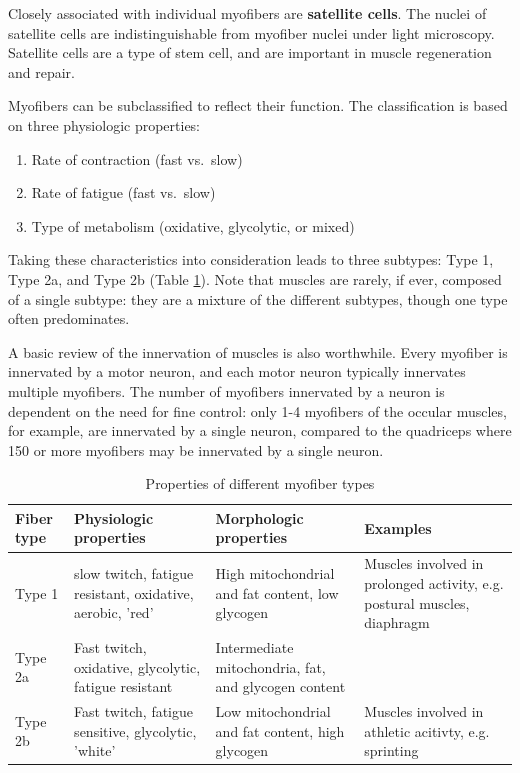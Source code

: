 \documentclass[openany]{report}
\providecommand{\tightlist}{%
  \setlength{\itemsep}{0pt}\setlength{\parskip}{0pt}}
\begin{document}
Closely associated with individual myofibers are \textbf{satellite
cells}. The nuclei of satellite cells are indistinguishable from
myofiber nuclei under light microscopy. Satellite cells are a type of
stem cell, and are important in muscle regeneration and repair.

Myofibers can be subclassified to reflect their function. The
classification is based on three physiologic properties:

\begin{enumerate}
\def\labelenumi{\arabic{enumi}.}
\tightlist
\item
  Rate of contraction (fast vs.~slow)
\item
  Rate of fatigue (fast vs.~slow)
\item
  Type of metabolism (oxidative, glycolytic, or mixed)
\end{enumerate}

Taking these characteristics into consideration leads to three subtypes:
Type 1, Type 2a, and Type 2b (Table \ref{tab:muscle-type}). Note that
muscles are rarely, if ever, composed of a single subtype: they are a
mixture of the different subtypes, though one type often predominates.

A basic review of the innervation of muscles is also worthwhile. Every
myofiber is innervated by a motor neuron, and each motor neuron
typically innervates multiple myofibers. The number of myofibers
innervated by a neuron is dependent on the need for fine control: only
1-4 myofibers of the occular muscles, for example, are innervated by a
single neuron, compared to the quadriceps where 150 or more myofibers
may be innervated by a single neuron.

\begin{table}[!h]

\caption{\label{tab:muscle-type}Properties of different myofiber types}
\centering
\begin{tabular}{l>{\raggedright\arraybackslash}p{10em}>{\raggedright\arraybackslash}p{10em}>{\raggedright\arraybackslash}p{10em}}
\toprule
Fiber type & Physiologic properties & Morphologic properties & Examples\\
\midrule
Type 1 & slow twitch, fatigue resistant, oxidative, aerobic, 'red' & High mitochondrial and fat content, low glycogen & Muscles involved in prolonged activity, e.g. postural muscles, diaphragm\\
Type 2a & Fast twitch, oxidative, glycolytic, fatigue resistant & Intermediate mitochondria, fat, and glycogen content & \\
Type 2b & Fast twitch, fatigue sensitive, glycolytic, 'white' & Low mitochondrial and fat content, high glycogen & Muscles involved in athletic acitivty, e.g. sprinting\\
\bottomrule
\end{tabular}
\end{table}
\end{document}

